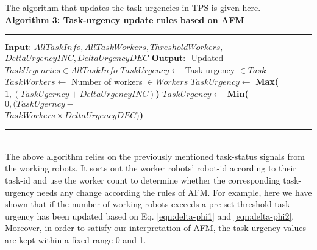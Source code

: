 \documentclass[journal]{IEEEtran}
\newcommand{\HRule}{\rule{\linewidth}{0.3mm}}
\begin{document}
The algorithm that updates the task-urgencies in TPS is given here.\\
\textbf{Algorithm 3: Task-urgency update rules based on AFM}
\vspace{-3mm}
\newline
\HRule
\begin{algorithmic}[1]
\begin{small}
\label{alg:tps}
\State $\textbf{Input: } AllTaskInfo, AllTaskWorkers, ThresholdWorkers,$\\ \hspace*{1cm}$DeltaUrgencyINC, DeltaUrgencyDEC$
\State $\textbf{Output: }$ Updated $TaskUrgencies \in AllTaskInfo$
\State $ TaskUrgency \gets $ Task-urgency $\in Task$
\State $ TaskWorkers \gets $ Number of workers $ \in Workers$
\State $ TaskUrgency \gets $ \textbf{Max(}$1, (TaskUgerncy + DeltaUrgencyINC)$\textbf{)}
\Else
\State $ TaskUrgency \gets $ \textbf{Min(}$0, (TaskUgerncy - $\\ \hspace*{5.3cm}$ TaskWorkers \times DeltaUrgencyDEC)$\textbf{)}
\EndIf
\EndFor
\end{small}
\end{algorithmic}
\vspace{-3mm} 
\HRule\\
The above algorithm relies on the previously mentioned task-status signals from the working robots.  It sorts out the worker robots' robot-id according to their task-id and use the worker count to determine whether the corresponding task-urgency needs any change  according the rules of AFM. For example, here we have shown that if the number of working robots exceeds a pre-set threshold task urgency has been updated based on Eq. \ref{eqn:delta-phi1} and \ref{eqn:delta-phi2}. Moreover, in order to satisfy our interpretation of AFM, the task-urgency values are kept within a fixed range 0 and 1.
\end{document}

